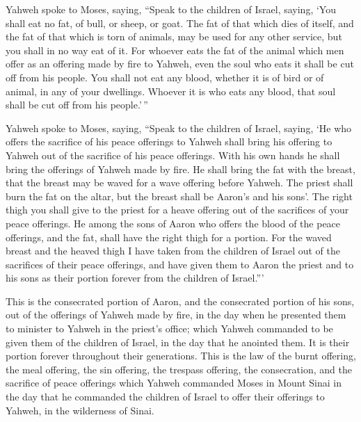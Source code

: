  Yahweh spoke to Moses, saying,  ``Speak
to the children of Israel, saying, `You shall eat no fat, of bull, or
sheep, or goat.  The fat of that which dies of itself,
and the fat of that which is torn of animals, may be used for any other
service, but you shall in no way eat of it.  For whoever
eats the fat of the animal which men offer as an offering made by fire
to Yahweh, even the soul who eats it shall be cut off from his people.
 You shall not eat any blood, whether it is of bird or of
animal, in any of your dwellings.  Whoever it is who eats
any blood, that soul shall be cut off from his people.'\,''

 Yahweh spoke to Moses, saying,  ``Speak
to the children of Israel, saying, `He who offers the sacrifice of his
peace offerings to Yahweh shall bring his offering to Yahweh out of the
sacrifice of his peace offerings.  With his own hands he
shall bring the offerings of Yahweh made by fire. He shall bring the fat
with the breast, that the breast may be waved for a wave offering before
Yahweh.  The priest shall burn the fat on the altar, but
the breast shall be Aaron's and his sons'.  The right
thigh you shall give to the priest for a heave offering out of the
sacrifices of your peace offerings.  He among the sons of
Aaron who offers the blood of the peace offerings, and the fat, shall
have the right thigh for a portion.  For the waved breast
and the heaved thigh I have taken from the children of Israel out of the
sacrifices of their peace offerings, and have given them to Aaron the
priest and to his sons as their portion forever from the children of
Israel.'''

 This is the consecrated portion of Aaron, and the
consecrated portion of his sons, out of the offerings of Yahweh made by
fire, in the day when he presented them to minister to Yahweh in the
priest's office;  which Yahweh commanded to be given them
of the children of Israel, in the day that he anointed them. It is their
portion forever throughout their generations.  This is
the law of the burnt offering, the meal offering, the sin offering, the
trespass offering, the consecration, and the sacrifice of peace
offerings  which Yahweh commanded Moses in Mount Sinai in
the day that he commanded the children of Israel to offer their
offerings to Yahweh, in the wilderness of Sinai.

